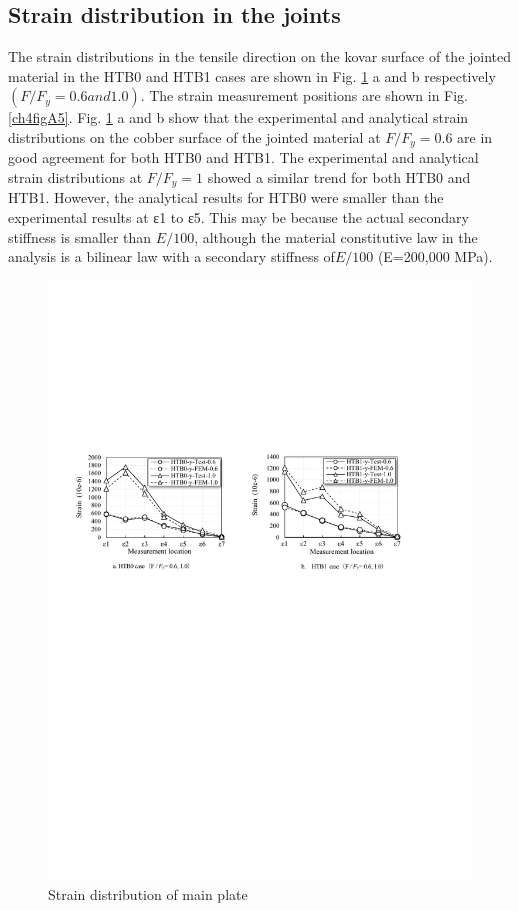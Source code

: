 \subsection{Strain distribution in the joints}

The strain distributions in the tensile direction on the kovar surface of the jointed material in the HTB0 and HTB1 cases are shown in Fig. \ref{ch4figA4} a and b respectively $(F / F_y = 0.6 and 1.0)$. The strain measurement positions are shown in Fig. \ref{ch4figA5}.
Fig. \ref{ch4figA4} a and b show that the experimental and analytical strain distributions on the cobber surface of the jointed material at $F / F_y = 0.6$ are in good agreement for both HTB0 and HTB1.
The experimental and analytical strain distributions at $F / F_y = 1$ showed a similar trend for both HTB0 and HTB1. However, the analytical results for HTB0 were smaller than the experimental results at ε1 to ε5. This may be because the actual secondary stiffness is smaller than $E/100$, although the material constitutive law in the analysis is a bilinear law with a secondary stiffness of$ E/100$ (E=200,000 MPa).

\begin{figure}
    \centering
    \includegraphics[width=\textwidth]{imgs/ch4/figA4.pdf}
    \caption{Strain distribution of main plate}
    \label{ch4figA4}
\end{figure}

